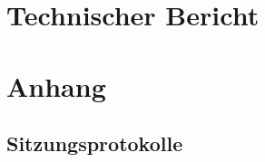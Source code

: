 \documentclass[11pt]{hsrthesis}
\begin{document}

\newpage











\newpage
{}
\tableofcontents
\newpage

\setcounter{page}{1}



\part{Technischer Bericht}

\part{Anhang}
\newpage
\renewcommand \thechapter{\Alph{chapter}}





\chapter{Sitzungsprotokolle}
 
\end{document}

